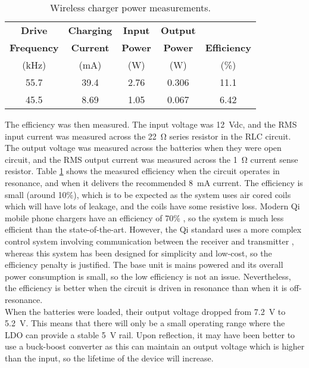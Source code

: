 \begin{table}[htbp]
	\begin{center}
	\begin{tabular}{|c|c|c|c|c|}
	\hline
	\textbf{Drive} & \textbf{Charging} & \textbf{Input} & \textbf{Output} & \\
	\textbf{Frequency} & \textbf{Current} & \textbf{Power} & \textbf{Power} & \textbf{Efficiency} \\
	(\si{\kilo\hertz}) & (\si{\milli\ampere}) & (\si{\watt}) & (\si{\watt}) & (\%)\\
	\hline
	55.7 & 39.4 & 2.76 & 0.306 & 11.1\\
	\hline
	45.5 & 8.69 & 1.05 & 0.067 & 6.42\\
	\hline	
	\end{tabular}
	\caption{Wireless charger power measurements.}
	\label{tab: efficiency}
	\end{center}
\end{table}

The efficiency was then measured. The input voltage was \SI{12}{\volt}dc, and the RMS input current was measured across the \SI{22}{\ohm} series resistor in the RLC circuit. The output voltage was measured across the batteries when they were open circuit, and the RMS output current was measured across the \SI{1}{\ohm} current sense resistor. Table \ref{tab: efficiency} shows the measured efficiency when the circuit operates in resonance, and when it delivers the recommended \SI{8}{\milli\ampere} current. The efficiency is small (around 10\%), which is to be expected as the system uses air cored coils which will have lots of leakage, and the coils have some resistive loss. Modern Qi mobile phone chargers have an efficiency of 70\% \cite{wireless_power_review}, so the system is much less efficient than the state-of-the-art. However, the Qi standard uses a more complex control system involving communication between the receiver and transmitter \cite{wireless_power_review}, whereas this system has been designed for simplicity and low-cost, so the efficiency penalty is justified. The base unit is mains powered and its overall power consumption is small, so the low efficiency is not an issue. Nevertheless, the efficiency is better when the circuit is driven in resonance than when it is off-resonance.\\ %

When the batteries were loaded, their output voltage dropped from \SI{7.2}{\volt} to \SI{5.2}{\volt}. This means that there will only be a small operating range where the LDO can provide a stable \SI{5}{\volt} rail. Upon reflection, it may have been better to use a buck-boost converter as this can maintain an output voltage which is higher than the input, so the lifetime of the device will increase.\\






